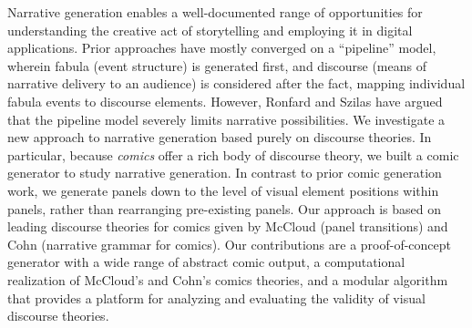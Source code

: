Narrative generation enables a well-documented range of opportunities for
understanding the creative act of storytelling and employing it in digital
applications.
Prior approaches have mostly converged on a ``pipeline'' model, wherein
fabula (event structure) is generated first, and discourse (means of
narrative delivery to an audience) is considered after the fact, mapping
individual fabula events to discourse elements. However, Ronfard and Szilas have
argued that the pipeline model severely limits
narrative possibilities. We investigate a new approach to
narrative generation based purely on discourse theories. In particular, 
because {\em comics} offer a rich body of discourse theory, we built a
comic generator to study narrative generation.  In contrast to prior comic
generation work, we generate panels down to the level of visual element
positions within panels, rather than rearranging pre-existing panels.  Our
approach is based on leading discourse theories for comics given by McCloud
(panel transitions) and Cohn (narrative grammar for comics).
Our contributions are a proof-of-concept generator with a wide range of
abstract comic output, a computational realization of McCloud's and Cohn's
comics theories, and a modular algorithm that provides a platform for
analyzing and evaluating the validity of visual discourse theories.


